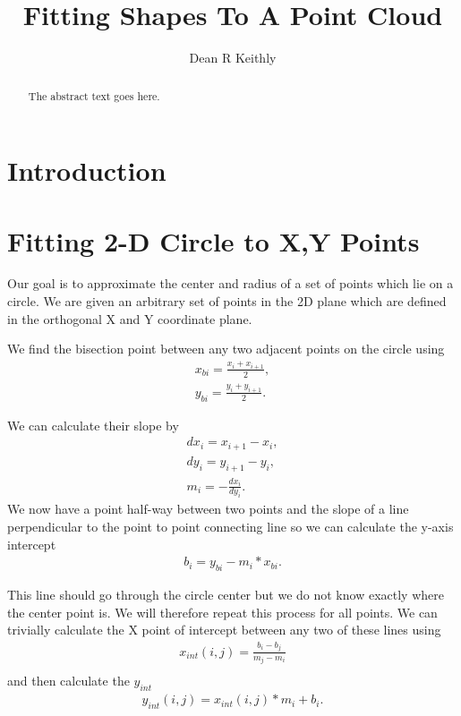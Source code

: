 \documentclass{article}
\begin{document}
\title{Fitting Shapes To A Point Cloud}
\author{Dean R Keithly}

\maketitle

\begin{abstract}
The abstract text goes here.
\end{abstract}

\section{Introduction}



\section{Fitting 2-D Circle to X,Y Points}
Our goal is to approximate the center and radius of a set of points which lie on a circle.
We are given an arbitrary set of points in the 2D plane which are defined in the orthogonal X and Y coordinate plane.

We find the bisection point between any two adjacent points on the circle using
\begin{align*}
x_{bi} = \frac{x_i+x_{i+1}}{2},\\
y_{bi} = \frac{y_i+y_{i+1}}{2}.
\end{align*}

We can calculate their slope by
\begin{align*}
dx_i = x_{i+1} - x_i,\\
dy_i = y_{i+1} - y_i,\\
m_i = -\frac{dx_i}{dy_i}.
\end{align*}
We now have a point half-way between two points and the slope of a line perpendicular to the point to point connecting line so we can calculate the y-axis intercept
\begin{align*}
b_i = y_{bi} - m_i*x_{bi}.
\end{align*}

This line should go through the circle center but we do not know exactly where the center point is.
We will therefore repeat this process for all points.
We can trivially calculate the X point of intercept between any two of these lines using 
\begin{align*}
x_{int}(i,j) = \frac{b_i-b_j}{m_j-m_i}\\
\end{align*}
and then calculate the $y_{int}$
\begin{align*}
y_{int}(i,j) = x_{int}(i,j)*m_i + b_i.
\end{align*}
\end{document}
